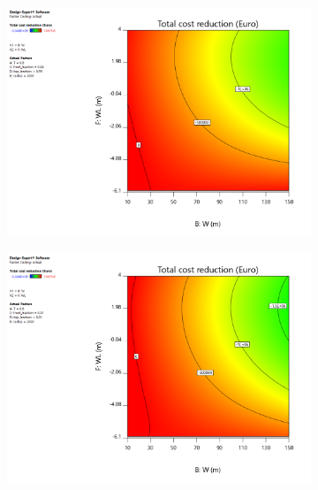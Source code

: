 \begin{figure}[h]
    \centering
    \begin{subfigure}[b]{0.475\textwidth}   
        \centering 
        \includegraphics[width=\textwidth]{figures/ComFLOW/Results DI1/costs/W_WL_Costs_total_reduction_box_png.png}
        \caption[]%
        {{\small }}    
        \label{fig: opt }
    \end{subfigure}
    \hfill
    \begin{subfigure}[b]{0.475\textwidth}   
        \centering 
        \includegraphics[width=\textwidth]{figures/ComFLOW/Results DI1/costs/W_WL_Costs_total_reduction_wedge_png.png}
        \caption[]%
        {{\small }}    
        \label{fig: opt }
    \end{subfigure}

    \caption{}
    \label{fig: }
\end{figure}


